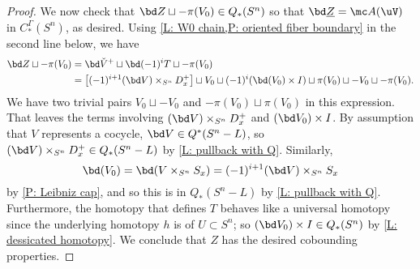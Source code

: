 \begin{example}
\begin{proof}
	We now check that $\bd Z \sqcup -\pi(V_0) \in Q_*(S^n)$ so that $\bd \underline{Z} = \mc A(\uV)$ in $C_*^\Gamma(S^n)$, as desired.
	Using \cref{L: W0 chain,P: oriented fiber boundary} in the second line below, we have
	\begin{align*}
	\bd Z \sqcup -\pi(V_0) & = \bd \check V^+ \sqcup \bd (-1)^i T \sqcup  -\pi(V_0)\\
	&=\left[(-1)^{i+1} (\bd V) \times_{S^n} D_x^+\right] \sqcup V_0 \sqcup
	(-1)^i(\bd (V_0) \times I) \sqcup \pi(V_0)\sqcup -V_0
	\sqcup  -\pi(V_0).
	\end{align*}
	We have two trivial pairs $V_0 \sqcup - V_0$ and $ -\pi(V_0) \sqcup \pi(V_0)$ in this expression.
	That leaves the terms involving $(\bd V) \times_{S^n} D_x^+$ and $(\bd V_0) \times I$.
	By assumption that $V$ represents a cocycle, $\bd V \in Q^*(S^n-L)$, so $(\bd V) \times_{S^n} D_x^+ \in Q_*(S^n-L)$ by \cref{L: pullback with Q}.
	Similarly, $$\bd (V_0) = \bd (V \times_{S^n} S_x) = (-1)^{i+1}(\bd V) \times_{S^n} S_x$$ by \cref{P: Leibniz cap}, and so this is in $Q_*(S^n-L)$ by \cref{L: pullback with Q}.
	Furthermore, the homotopy that defines $T$ behaves like a universal homotopy since the underlying homotopy $h$ is of $U \subset S^n$; so $(\bd V_0) \times I \in Q_*(S^n)$ by \cref{L: dessicated homotopy}.
	We conclude that $Z$ has the desired cobounding properties.


\end{proof}
\end{example}

